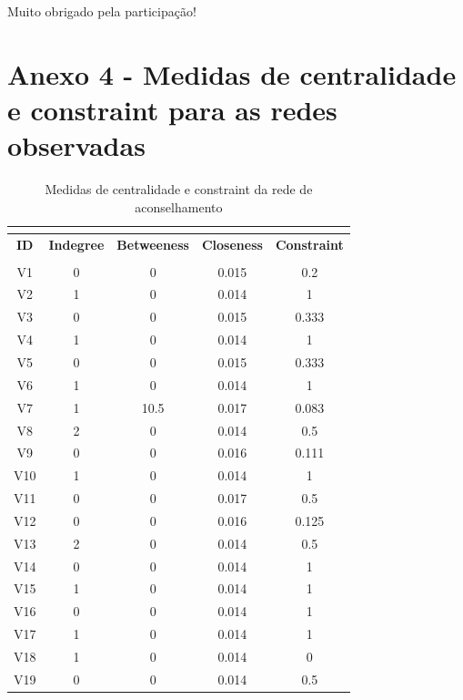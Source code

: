 \documentclass[a4paper, 12pt, openright, oneside, german, french, english, brazil]{abntex2}
\begin{document}
	Muito obrigado pela participação!




	\chapter*[Anexo 4]{Anexo 4 - Medidas de centralidade e constraint para as redes observadas}

		\begin{SingleSpace}
		\begin{footnotesize}
			\begin{center}
				\begin{longtable}{c c c c c}
					\caption{Medidas de centralidade e constraint da rede de aconselhamento}\\
					\label{centralidades:conselho}\\
					\hline
					\textbf{ID}  & \textbf{Indegree} & \textbf{Betweeness} & \textbf{Closeness} & \textbf{Constraint} \\
					\hline
					\endfirsthead
					\hline
					\endhead
					\hline
					\endfoot
					\hline
					\multicolumn{5}{l}{Fonte: Elaboração do autor}\\
					\endlastfoot
					V1 & 0 & 0 & 0.015 & 0.2 \\ 
					V2 & 1 & 0 & 0.014 & 1 \\ 
					V3 & 0 & 0 & 0.015 & 0.333 \\ 
					V4 & 1 & 0 & 0.014 & 1 \\ 
					V5 & 0 & 0 & 0.015 & 0.333 \\ 
					V6 & 1 & 0 & 0.014 & 1 \\ 
					V7 & 1 & 10.5 & 0.017 & 0.083 \\ 
					V8 & 2 & 0 & 0.014 & 0.5 \\ 
					V9 & 0 & 0 & 0.016 & 0.111 \\ 
					V10 & 1 & 0 & 0.014 & 1 \\ 
					V11 & 0 & 0 & 0.017 & 0.5 \\ 
					V12 & 0 & 0 & 0.016 & 0.125 \\ 
					V13 & 2 & 0 & 0.014 & 0.5 \\ 
					V14 & 0 & 0 & 0.014 & 1 \\ 
					V15 & 1 & 0 & 0.014 & 1 \\ 
					V16 & 0 & 0 & 0.014 & 1 \\ 
					V17 & 1 & 0 & 0.014 & 1 \\ 
					V18 & 1 & 0 & 0.014 & 0 \\ 
					V19 & 0 & 0 & 0.014 & 0.5 \\ 

\end{longtable}
\end{center}
\end{footnotesize}
\end{SingleSpace}
\end{document}

